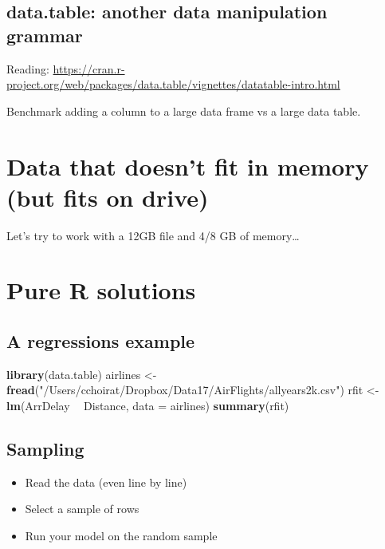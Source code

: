 \documentclass[]{book}
\newenvironment{Shaded}{\begin{snugshade}}{\end{snugshade}}
\newcommand{\KeywordTok}[1]{\textcolor[rgb]{0.13,0.29,0.53}{\textbf{#1}}}
\newcommand{\DataTypeTok}[1]{\textcolor[rgb]{0.13,0.29,0.53}{#1}}
\newcommand{\StringTok}[1]{\textcolor[rgb]{0.31,0.60,0.02}{#1}}
\newcommand{\OperatorTok}[1]{\textcolor[rgb]{0.81,0.36,0.00}{\textbf{#1}}}
\newcommand{\NormalTok}[1]{#1}
\providecommand{\tightlist}{%
  \setlength{\itemsep}{0pt}\setlength{\parskip}{0pt}}
\theoremstyle{definition}
\theoremstyle{definition}
\theoremstyle{definition}
\theoremstyle{remark}
\let\BeginKnitrBlock\begin \let\EndKnitrBlock\end
\begin{document}
\subsection{data.table: another data manipulation
grammar}\label{data.table-another-data-manipulation-grammar}

Reading:
\url{https://cran.r-project.org/web/packages/data.table/vignettes/datatable-intro.html}

\BeginKnitrBlock{exercise}
\protect\hypertarget{exr:unnamed-chunk-112}{}{\label{exr:unnamed-chunk-112}
}Benchmark adding a column to a large data frame vs a large data table.
\EndKnitrBlock{exercise}

\section{Data that doesn't fit in memory (but fits on
drive)}\label{data-that-doesnt-fit-in-memory-but-fits-on-drive}

Let's try to work with a 12GB file and 4/8 GB of memory\ldots{}

\section{Pure R solutions}\label{pure-r-solutions}

\subsection{A regressions example}\label{a-regressions-example}

\begin{Shaded}
\begin{Highlighting}[]
\KeywordTok{library}\NormalTok{(data.table)}
\NormalTok{airlines <-}\StringTok{ }\KeywordTok{fread}\NormalTok{(}\StringTok{"/Users/cchoirat/Dropbox/Data17/AirFlights/allyears2k.csv"}\NormalTok{)}
\NormalTok{rfit <-}\StringTok{ }\KeywordTok{lm}\NormalTok{(ArrDelay }\OperatorTok{~}\StringTok{ }\NormalTok{Distance, }\DataTypeTok{data =}\NormalTok{ airlines)}
\KeywordTok{summary}\NormalTok{(rfit)}
\end{Highlighting}
\end{Shaded}

\subsection{Sampling}\label{sampling}

\begin{itemize}
\tightlist
\item
  Read the data (even line by line)
\item
  Select a sample of rows
\item
  Run your model on the random sample
\end{itemize}
\end{document}
